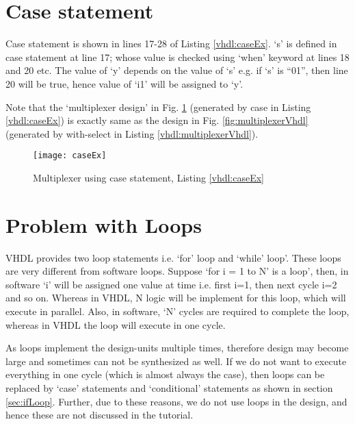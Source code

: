 \section{Case statement}
Case statement is shown in lines 17-28 of Listing \ref{vhdl:caseEx}. `s' is defined in case statement at line 17; whose value is checked using `when' keyword at lines 18 and 20 etc. The value of `y' depends on the value of `s' e.g. if `s' is ``01'', then line 20 will be true, hence value of `i1' will be assigned to `y'. 

\begin{noNumBox}
	Note that the `multiplexer design' in Fig. \ref{fig:caseEx} (generated by case in Listing \ref{vhdl:caseEx}) is exactly same as the design in Fig. \ref{fig:multiplexerVhdl} (generated by with-select in Listing \ref{vhdl:multiplexerVhdl}). 
\end{noNumBox}



\begin{figure}
	\centering
	\texttt{[image: caseEx]}
	\caption{Multiplexer using case statement, Listing \ref{vhdl:caseEx}}
	\label{fig:caseEx}
\end{figure}


\section{Problem with Loops}

VHDL provides two loop statements i.e. `for' loop and `while' loop'. These loops are very different from software loops. Suppose `for i = 1 to N' is a loop', then, in software `i' will be assigned one value at time i.e. first i=1, then next cycle i=2 and so on. Whereas in VHDL, N logic will be implement for this loop, which will execute in parallel. Also, in software, `N' cycles are required to complete the loop, whereas in VHDL the loop will execute in one cycle. 
\begin{noNumBox}
	As loops implement the design-units multiple times, therefore design may become large and sometimes can not be synthesized as well. If we do not want to execute everything in one cycle (which is almost always the case), then loops can be replaced by `case' statements and `conditional' statements as shown in section \ref{sec:ifLoop}. Further, due to these reasons, we do not use loops in the design, and hence these are not discussed in the tutorial.
\end{noNumBox}   


